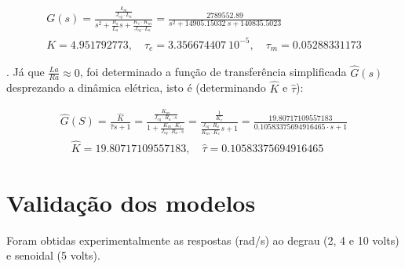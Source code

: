 \documentclass[10pt]{article}
\begin{document}
\begin{equation}
\begin{aligned}
    G(s) = \frac{\frac{k_m}{J_{eq} \cdot L_a}}{s^2 + \frac{R_a}{L_a}s + \frac{K_e \cdot K_m}{J_{eq} \cdot L_a}} = \frac{2789552.89}{s^2 + 14905.15032 \ s + 140835.5023} \\
    K = 4.951792773, \quad \tau_e = 3.356674407 \ 10^{-5}, \quad \tau_m = 0.05288331173 
\end{aligned}
\end{equation}

. Já que $\frac{La}{Ra} \approx 0$, foi determinado a função de transferência simplificada $\hat{G}(s)$ desprezando a dinâmica elétrica, isto é (determinando $\hat{K}$ e $\hat{\tau}$):

\begin{equation}
\begin{aligned}
    \hat{G}(S) = \frac{\hat{K}}{\hat{\tau}s + 1}
    = \frac{\frac{K_m}{J_{eq} \cdot R_a \cdot s}}{1 + \frac{K_m \cdot K_e}{J_{eq} \cdot R_a \cdot s}}
    = \frac{\frac{1}{K_e}}{\frac{J_{eq} \cdot R_a}{K_m \cdot K_e}s + 1}
    = \frac{19.80717109557183}{0.10583375694916465 \cdot s + 1} \\
    \quad \hat{K} = 19.80717109557183,
    \quad \hat{\tau} = 0.10583375694916465 
\end{aligned}
\end{equation}

\section{Validação dos modelos}

\quad Foram obtidas experimentalmente as respostas (rad/s) ao degrau (2, 4 e 10 volts) e
senoidal (5 volts).
\end{document}
